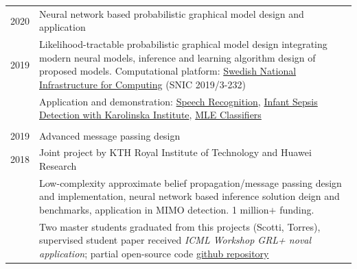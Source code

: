 \documentclass[a4paper,10pt]{article}
\begin{document}
\begin{tabular}{r|p{13cm}}
\textsc{2020} & Neural network based probabilistic graphical model design and application\\
  \textsc{2019} & Likelihood-tractable probabilistic graphical model design integrating modern neural models, inference and learning algorithm design of proposed models. Computational platform: \href{https://www.snic.se/}{Swedish National Infrastructure for Computing} (SNIC 2019/3-232)\\
              & Application and demonstration: \href{https://github.com/FirstHandScientist/genhmm}{Speech Recognition}, \href{https://arxiv.org/pdf/1910.13904.pdf}{Infant Sepsis Detection with Karolinska Institute}, \href{https://github.com/FirstHandScientist/classification-EM-GM}{MLE Classifiers}\\
    \multicolumn{2}{c}{} \\
  \textsc{2019}  & Advanced message passing design \\
  \textsc{2018}& Joint project by KTH Royal Institute of Technology and Huawei Research\\
              & Low-complexity approximate belief propagation/message passing design and implementation, neural network based inference solution deign and benchmarks, application in MIMO detection. 1 million$+$ funding.\\
              & Two master students graduated from this projects (Scotti, Torres), supervised student paper received \textit{ICML Workshop GRL+ noval application}; partial open-source code \href{https://github.com/FirstHandScientist/amp}{github repository} \\

\end{tabular}


\begin{bibunit}
  \renewcommand\refname{Publications (\href{https://scholar.google.com/citations?hl=en&user=eK9LoQMAAAAJ&view_op=list_works&sortby=pubdate}{my Scholar})}
  \nocite{
    liu2020region,
    liu2020alpha,
    zuxing2020cdc,
    anubhad2020,
    andrea2020,
    liu2020powering,
    honore2020hidden,
    liu2020neural,
    chatterjee2019ssfn,
    liu2019discontinuous,
    liu2019entropy,
    liu2019alpha,
    liu2019dominant,
    liu2018will}
  \footnotesize{\putbib[../bibfile]}
\end{bibunit}
\end{document}
